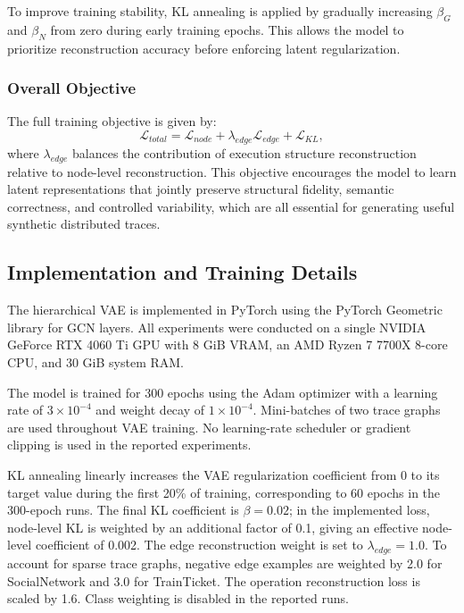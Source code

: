 \documentclass[sigconf,review]{acmart}
\begin{document}
To improve training stability, KL annealing is applied by gradually increasing $\beta_G$ and $\beta_N$ from zero during early training epochs. This allows the model to prioritize reconstruction accuracy before enforcing latent regularization.

\subsubsection{Overall Objective}

The full training objective is given by:
\begin{equation}
\mathcal{L}_{total} =
\mathcal{L}_{node}
+ \lambda_{edge} \mathcal{L}_{edge}
+ \mathcal{L}_{KL},
\end{equation}
where $\lambda_{edge}$ balances the contribution of execution structure reconstruction relative to node-level reconstruction. This objective encourages the model to learn latent representations that jointly preserve structural fidelity, semantic correctness, and controlled variability, which are all essential for generating useful synthetic distributed traces.

\begingroup
\color{blue}
\subsection{Implementation and Training Details}
\label{sec:impl}

The hierarchical VAE is implemented in PyTorch using the PyTorch Geometric library for GCN layers. All experiments were conducted on a single NVIDIA GeForce RTX 4060 Ti GPU with 8 GiB VRAM, an AMD Ryzen 7 7700X 8-core CPU, and 30 GiB system RAM.

The model is trained for 300 epochs using the Adam optimizer with a learning rate of $3\times10^{-4}$ and weight decay of $1\times10^{-4}$. Mini-batches of two trace graphs are used throughout VAE training. No learning-rate scheduler or gradient clipping is used in the reported experiments.

KL annealing linearly increases the VAE regularization coefficient from 0 to its target value during the first 20\% of training, corresponding to 60 epochs in the 300-epoch runs. The final KL coefficient is $\beta=0.02$; in the implemented loss, node-level KL is weighted by an additional factor of 0.1, giving an effective node-level coefficient of 0.002. The edge reconstruction weight is set to $\lambda_{edge}=1.0$. To account for sparse trace graphs, negative edge examples are weighted by 2.0 for SocialNetwork and 3.0 for TrainTicket. The operation reconstruction loss is scaled by 1.6. Class weighting is disabled in the reported runs.
\end{document}
